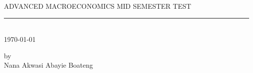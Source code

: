 \documentclass[12pt]{article}
\numberwithin{equation}{subsection} %
\renewcommand{\baselinestretch}{2}
\begin{document}
\pagestyle{empty}



\newpage
\begin{center}
\thispagestyle{empty} %
  {ADVANCED MACROECONOMICS MID SEMESTER TEST\\ [.07in]} \rm
\rule{1.25in}{.01in}\\[.0 in]
\today
\vspace{.6in}



\vspace{.6in}

\vspace{.6in}

by  \\ [.06in]
{Nana  Akwasi Abayie Boateng} \\[.06in]
\end{center}
\author{Nana Akwasi Abayie Boateng\footnotemark[1]}












\def\R{\mathbb{R}}
\def\N{\mathbb{N}}
\def\Z{\mathbb{Z}}
\def\Q{\mathbb{Q}}
\def\la{\langle}
\def\ra{\rangle}

\def\dist{{\rm dist}}
\def\X{{\bf X}}
\def\C{{\bf C}}
\def\D{{\bf D}}
\def\I{{\bf I}}
\def\J{{\bf J}}
\def\x{{\bf x}}
\def\y{{\bf y}}
\def\z{{\bf z}}
\def\W{{\bf W}}
\def\g{{\bf g}}
\def\e{{\bf e}}
\def\b{{\bf b}}
\def\u{{\bf u}}
\def\Beta{{\bf \beta}}
\def\pen{{\rm pen}}
\def\argmin{{\rm argmin}}
\def\diag{{\rm diag}}
\def\sgn{{\rm sgn}}
\def\supp{{\rm\rm supp}}


\vspace*{1cm}
\newcommand{\Appendixpage}{
    \setcounter{section}{0}
    \renewcommand{\baselinestretch}{1}\small\normalsize
    \thispagestyle{myheadings}
    \addcontentsline{toc}{section}{APPENDICES\dotfill}
    \mbox{}
    \vfil
    \begin{center}%
    APPENDICES
    \vfil
    \end{center}%
    \renewcommand{\baselinestretch}{1.66} \small\normalsize%
    \cleardoublepage
  }
\end{document}
